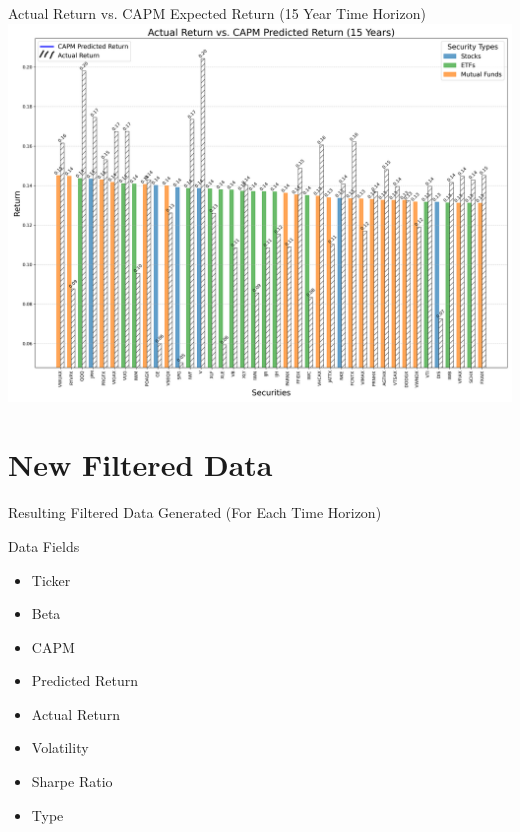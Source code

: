 \documentclass{beamer}
\begin{document}
\begin{frame}{Actual Return vs. CAPM Expected Return (15 Year Time Horizon)}
    \centering
    \includegraphics[height=0.8\textheight]{actual_vs_capm_15_years.png}
\end{frame}

\section{New Filtered Data}
\begin{frame}{Resulting Filtered Data Generated (For Each Time Horizon)}
    \begin{block}{Data Fields}
        \begin{multicols}{2}
        \begin{itemize}
            \item Ticker
            \item Beta
            \item CAPM
            \item Predicted Return
            \item Actual Return
            \item Volatility
            \item Sharpe Ratio
            \item Type
        \end{itemize}
        \end{multicols}
    \end{block}
\end{frame}
\end{document}
